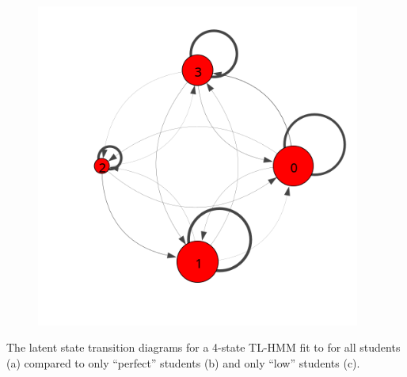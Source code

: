 \begin{marginfigure}
  \begin{subfigure}[t]{\textwidth}
    \includegraphics[width=0.95\textwidth,trim={0, 3cm 0 2cm}]{../figures/trans-comp/trans-low.png}
    \caption{\label{fig:trans-low}}
  \end{subfigure}

  \caption{The latent state transition diagrams for a 4-state TL-HMM fit to
  \protect\textretrieval{} for all students (a) compared to only ``perfect''
  students (b) and only ``low'' students (c).}
  \label{fig:trans-comp}
\end{marginfigure}

